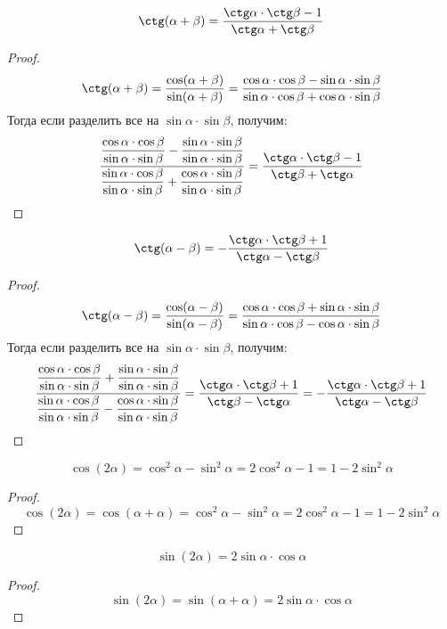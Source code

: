 \documentclass[12pt]{article}
\begin{document}
    \begin{statement}
        $$\ctg(\alpha+\beta)=\dfrac{\ctg\alpha\cdot\ctg\beta-1}{\ctg\alpha+\ctg\beta}$$
    \end{statement}
    \begin{proof}
        $$\ctg(\alpha+\beta)=\dfrac{\cos(\alpha+\beta)}{\sin(\alpha+\beta)}=\dfrac{\cos\alpha\cdot\cos\beta-\sin\alpha\cdot\sin\beta}{\sin\alpha\cdot\cos\beta+\cos\alpha\cdot\sin\beta}$$
        Тогда если разделить все на $\sin\alpha\cdot\sin\beta$, получим:
        $$\dfrac{\dfrac{\cos\alpha\cdot\cos\beta}{\sin\alpha\cdot\sin\beta}-\dfrac{\sin\alpha\cdot\sin\beta}{\sin\alpha\cdot\sin\beta}}{\dfrac{\sin\alpha\cdot\cos\beta}{\sin\alpha\cdot\sin\beta}+\dfrac{\cos\alpha\cdot\sin\beta}{\sin\alpha\cdot\sin\beta}}=\dfrac{\ctg\alpha\cdot\ctg\beta-1}{\ctg\beta+\ctg\alpha}$$
    \end{proof}
    \begin{statement}
        $$\ctg(\alpha-\beta)=-\dfrac{\ctg\alpha\cdot\ctg\beta+1}{\ctg\alpha-\ctg\beta}$$
    \end{statement}
    \begin{proof}
        $$\ctg(\alpha-\beta)=\dfrac{\cos(\alpha-\beta)}{\sin(\alpha-\beta)}=\dfrac{\cos\alpha\cdot\cos\beta+\sin\alpha\cdot\sin\beta}{\sin\alpha\cdot\cos\beta-\cos\alpha\cdot\sin\beta}$$
        Тогда если разделить все на $\sin\alpha\cdot\sin\beta$, получим:
        $$\dfrac{\dfrac{\cos\alpha\cdot\cos\beta}{\sin\alpha\cdot\sin\beta}+\dfrac{\sin\alpha\cdot\sin\beta}{\sin\alpha\cdot\sin\beta}}{\dfrac{\sin\alpha\cdot\cos\beta}{\sin\alpha\cdot\sin\beta}-\dfrac{\cos\alpha\cdot\sin\beta}{\sin\alpha\cdot\sin\beta}}=\dfrac{\ctg\alpha\cdot\ctg\beta+1}{\ctg\beta-\ctg\alpha}=-\dfrac{\ctg\alpha\cdot\ctg\beta+1}{\ctg\alpha-\ctg\beta}$$
    \end{proof}
    \begin{statement}
        $$\cos (2\alpha)=\cos^2\alpha-\sin^2\alpha=2\cos^2\alpha-1=1-2\sin^2\alpha$$
    \end{statement}
    \begin{proof}
        $$\cos (2\alpha)=\cos(\alpha + \alpha)=\cos^2\alpha-\sin^2\alpha=2\cos^2\alpha-1=1-2\sin^2\alpha$$
    \end{proof}
    \begin{statement}
        $$\sin(2\alpha)=2 \sin \alpha \cdot \cos \alpha$$
    \end{statement}
    \begin{proof}
        $$\sin(2\alpha)=\sin(\alpha+\alpha)=2 \sin \alpha \cdot \cos \alpha$$
    \end{proof}
\end{document}
